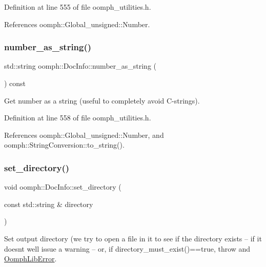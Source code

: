 Definition at line 555 of file oomph\+\_\+utilities.\+h.



References oomph\+::\+Global\+\_\+unsigned\+::\+Number.

\mbox{\label{classoomph_1_1DocInfo_acb66c97dad89c6e9fb6334e9ac530093}} 
\subsubsection{\texorpdfstring{number\+\_\+as\+\_\+string()}{number\_as\_string()}}
{\footnotesize\ttfamily std\+::string oomph\+::\+Doc\+Info\+::number\+\_\+as\+\_\+string (\begin{DoxyParamCaption}{ }\end{DoxyParamCaption}) const\hspace{0.3cm}{\ttfamily [inline]}}



Get number as a string (useful to completely avoid C-\/strings). 



Definition at line 558 of file oomph\+\_\+utilities.\+h.



References oomph\+::\+Global\+\_\+unsigned\+::\+Number, and oomph\+::\+String\+Conversion\+::to\+\_\+string().

\mbox{\label{classoomph_1_1DocInfo_a9800cf1d178162d521588e6e336a6e65}} 
\subsubsection{\texorpdfstring{set\+\_\+directory()}{set\_directory()}}
{\footnotesize\ttfamily void oomph\+::\+Doc\+Info\+::set\+\_\+directory (\begin{DoxyParamCaption}\item[{const std\+::string \&}]{directory }\end{DoxyParamCaption})}



Set output directory (we try to open a file in it to see if the directory exists -- if it doesn\textquotesingle{}t we\textquotesingle{}ll issue a warning -- or, if directory\+\_\+must\+\_\+exist()==true, throw and \hyperlink{classoomph_1_1OomphLibError}{Oomph\+Lib\+Error}. 

